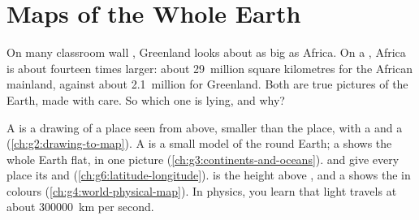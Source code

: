 \chapter{Maps of the Whole Earth}\label{ch:g9:maps-of-the-earth}

On many classroom wall , Greenland looks about as big as Africa. On a
, Africa is about fourteen times larger: about 29~million square
kilometres for the African mainland, against about 2.1~million for
Greenland. Both are true pictures of the Earth, made with care. So which
one is lying, and why?

\begin{recall}
A  is a drawing of a place seen from above, smaller than the place, with
a  and a  (\cref{ch:g2:drawing-to-map}). A  is a small
model of the round Earth; a  shows the whole Earth flat, in one
picture (\cref{ch:g3:continents-and-oceans}).  and  give
every place its  and  (\cref{ch:g6:latitude-longitude}).
 is the height above , and a  shows the
 in colours (\cref{ch:g4:world-physical-map}). In physics, you learn
that light travels at about \qty{300000}{km} per second.
\end{recall}

